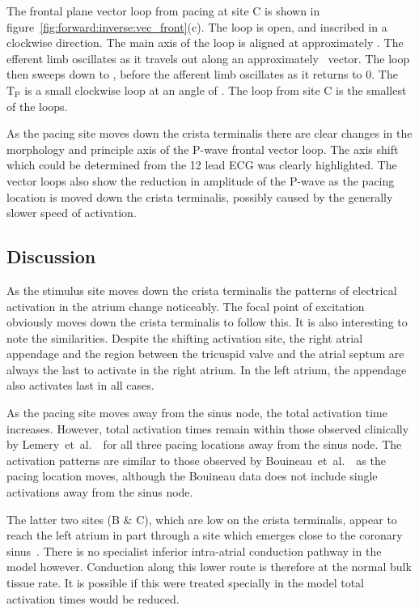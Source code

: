 The frontal plane vector loop from pacing at site C is shown in
figure~\ref{fig:forward:inverse:vec_front}(c).
The loop is open, and inscribed in a clockwise direction.
The main axis of the loop is aligned at approximately .
The efferent limb oscillates as it travels out along an approximately
\ vector.
The loop then sweeps down to , before the afferent limb oscillates as
it returns to 0.
The $\text{T}_{\text{P}}$ is a small clockwise loop at an angle of .
The loop from site C is the smallest of the loops.

As the pacing site moves down the crista terminalis there are clear changes in
the morphology and principle axis of the P-wave frontal vector loop.
The axis shift which could be determined from the 12 lead ECG was clearly
highlighted.
The vector loops also show the reduction in amplitude of the P-wave as the
pacing location is moved down the crista terminalis, possibly caused by the
generally slower speed of activation.

\subsection{Discussion}

As the stimulus site moves down the crista terminalis the patterns of electrical
activation in the atrium change noticeably.
The focal point of excitation obviously moves down the crista terminalis to
follow this.
It is also interesting to note the similarities.
Despite the shifting activation site, the right atrial appendage and the region
between the tricuspid valve and the atrial septum are always the last to
activate in the right atrium.
In the left atrium, the appendage also activates last in all cases.

As the pacing site moves away from the sinus node, the total activation time
increases.
However, total activation times remain within those observed clinically by
Lemery~et~al.~\cite{Lemery2004}\ for all three pacing locations away from the
sinus node.
The activation patterns are similar to those observed by
Bouineau~et~al.~\cite{Bouineau1988}\ as the pacing location moves, although the
Bouineau data does not include single activations away from the sinus node.

The latter two sites (B \& C), which are low on the crista terminalis, appear to
reach the left atrium in part through a site which emerges close to the coronary
sinus~\cite{Platonov2007,Platonov2008,Markides2003,Lemery2004}.
There is no specialist inferior intra-atrial conduction pathway in the model
however.
Conduction along this lower route is therefore at the normal bulk tissue rate.
It is possible if this were treated specially in the model total activation
times would be reduced.

